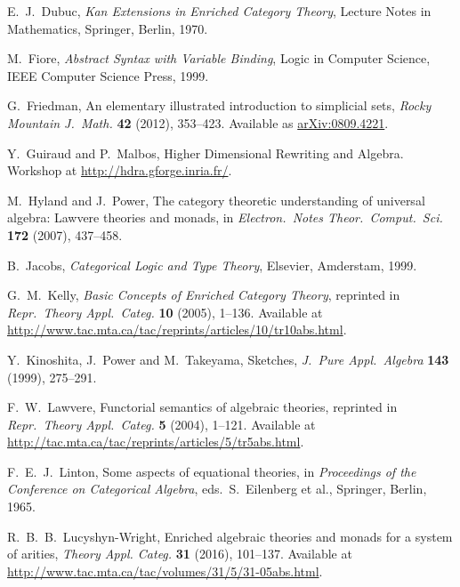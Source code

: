 \documentclass{amsart}
\theoremstyle{definition}
\begin{document}
\begin{thebibliography}{100}
 E.\ J.\ Dubuc, \textsl{Kan Extensions in Enriched Category Theory}, Lecture Notes in Mathematics, Springer, Berlin, 1970.

 M.\ Fiore, \textsl{Abstract Syntax with Variable Binding}, Logic in Computer Science, IEEE Computer Science Press, 1999.

 G.\ Friedman, An elementary illustrated introduction to simplicial sets, 
\textsl{Rocky Mountain J.\ Math.} \textbf{42} (2012), 353--423.  Available as \href{https://arxiv.org/abs/0809.4221}{arXiv:0809.4221}.

 Y.\ Guiraud and P.\ Malbos, Higher Dimensional Rewriting and Algebra. Workshop at \href{http://hdra.gforge.inria.fr/}{http://hdra.gforge.inria.fr/}.

 M.\ Hyland and J.\ Power, The category theoretic understanding of 
universal algebra: Lawvere theories and monads, in \textsl{Electron.\ Notes Theor.\ Comput.\ Sci.} \textbf{172} (2007), 437--458.

 B.\ Jacobs, \textsl{Categorical Logic and Type Theory}, Elsevier, Amderstam, 1999.
	
 G.\ M.\ Kelly, \textsl{Basic Concepts of Enriched Category Theory}, reprinted in \textsl{Repr.\ Theory Appl.\ Categ.} \textbf{10} (2005), 1--136.  Available at \href{http://www.tac.mta.ca/tac/reprints/articles/10/tr10abs.html}{http://www.tac.mta.ca/tac/reprints/articles/10/tr10abs.html}.

 Y.\ Kinoshita, J.\ Power and M.\ Takeyama, Sketches,
\textsl{J.\ Pure Appl.\ Algebra} \textbf{143} (1999), 275--291.

 F.\ W.\ Lawvere, Functorial semantics of algebraic theories, reprinted in
\textsl{Repr.\ Theory Appl.\ Categ.} \textbf{5} (2004), 1--121.  Available at \href{http://tac.mta.ca/tac/reprints/articles/5/tr5abs.html}{http://tac.mta.ca/tac/reprints/articles/5/tr5abs.html}.

 F.\ E.\ J.\ Linton, Some aspects of equational theories, in 
\textsl{Proceedings of the Conference on Categorical Algebra}, eds.\ S.\ Eilenberg et al.,
Springer, Berlin, 1965.

 R.\ B.\ B.\ Lucyshyn-Wright, Enriched algebraic theories and monads for a system of arities, \textsl{Theory Appl. Categ.} \textbf{31} (2016), 101--137.  Available at \href{http://www.tac.mta.ca/tac/volumes/31/5/31-05abs.html}{http://www.tac.mta.ca/tac/volumes/31/5/31-05abs.html}.
	

\end{thebibliography}
\end{document}
